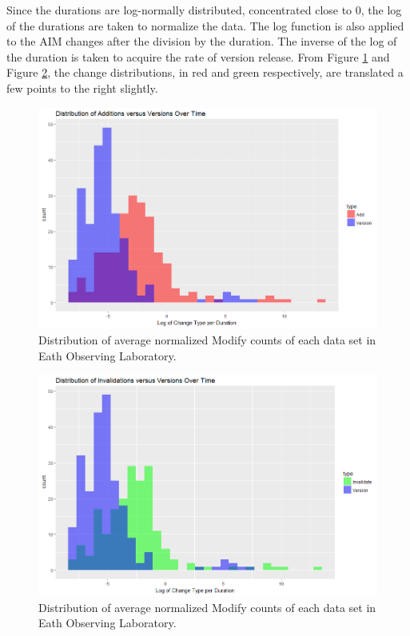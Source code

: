 Since the durations are log-normally distributed, concentrated close to 0, the log of the durations are taken to normalize the data.  
The log function is also applied to the AIM changes after the division by the duration.  
The inverse of the log of the duration is taken to acquire the rate of version release.
From Figure \ref{EOL_Add_Ver} and Figure \ref{EOL_Inv_Ver}, the change distributions, in red and green respectively, are translated a few points to the right slightly.
\begin{figure}%
	\centering
	\includegraphics[scale=.6]{figures/Eol_Add_Ver_Rate.png}
	\caption{Distribution of average normalized Modify counts of each data set in Eath Observing Laboratory.}
	\label{EOL_Add_Ver}
\end{figure}
\begin{figure}%
	\centering
	\includegraphics[scale=.6]{figures/Eol_Inv_Ver_Rate.png}
	\caption{Distribution of average normalized Modify counts of each data set in Eath Observing Laboratory.}
	\label{EOL_Inv_Ver}
\end{figure}
